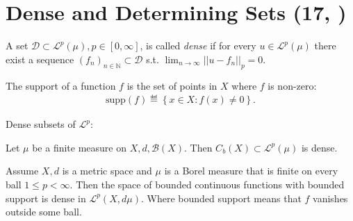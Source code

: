 \section{Dense and Determining Sets \tiny{(17, \cite{schilling2017measures})}}
\begin{definition}
    A set \(\mathcal{D}\subset\mathcal{L}^p(\mu), p\in[0,\infty]\), is called \emph{dense} if for every \(u\in\mathcal{L}^p(\mu)\) there exist
    a sequence \((f_n)_{n\in\mathbb{N}}\subset\mathcal{D}\) s.t. \(\lim_{n\rightarrow\infty}\vert\vert u-f_n\vert\vert_p=0\).
\end{definition}
\begin{definition}
    The support of a function \(f\) is the set of points in \(X\) where \(f\) is non-zero:
    \begin{align*}
        \text{supp}(f) \eqdef \left\{x\in X:f(x)\neq0\right\}.
    \end{align*}
\end{definition}
\ifcolor
\color{blue}Dense subsets of \(\mathcal{L}^p\):\color{black}
\fi
\begin{theorem}
    Let \(\mu\) be a finite measure on \(X,d,\mathscr{B}(X)\). Then \(C_b(X)\subset \mathcal{L}^p(\mu)\) is dense. 
\end{theorem}
\begin{theorem}
    Assume \(X,d\) is a metric space and \(\mu\) is a Borel measure that is finite on every ball \(1\leq p<\infty\). Then the space of 
    bounded continuous functions with bounded support is dense in \(\mathcal{L}^p(X,d\mu)\). Where bounded support means that \(f\) vanishes outside
    some ball.
\end{theorem}
\ifdetailed
